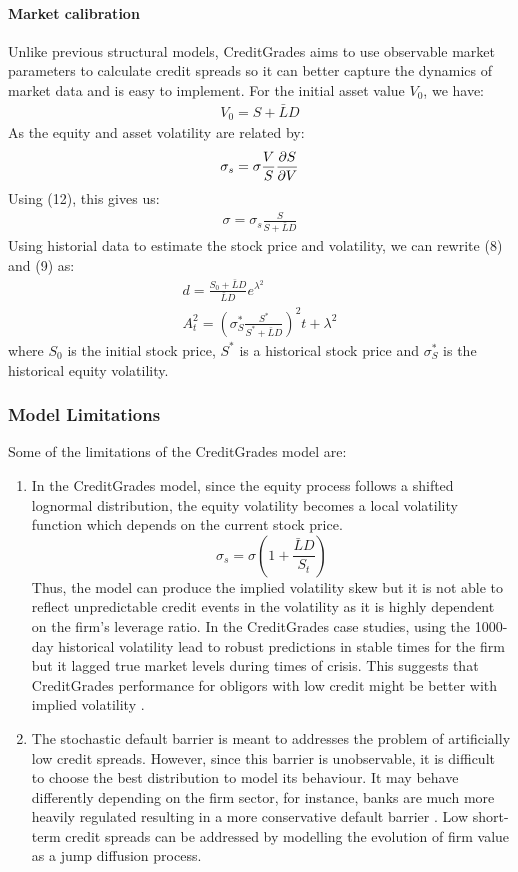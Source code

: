 \documentclass[11t,a4paper]{article}
\begin{document}
\paragraph {Market calibration}
Unlike previous structural models, CreditGrades aims to use observable market parameters to calculate credit spreads so it can better capture the dynamics of market data and is easy to implement. For the initial asset value $V_0$, we have:
\begin{align}
    V_0 = S + \bar{L}D
\end{align}
As the equity and asset volatility are related by:
\begin{align}
    \sigma_s = \sigma \frac{V}{S}\pdv{S}{V}
\end{align}
Using (12), this gives us:
\begin{align}
    \sigma = \sigma_s \frac{S}{S + \bar{L}D}
\end{align}
Using historial data to estimate the stock price and volatility, we can rewrite (8) and (9) as:
\begin{gather}
d = \frac{S_0 + \bar{L}D}{\bar{L}D} e^{\lambda^2}\\
A^2_t = (\sigma_S^*\frac{S^*}{S^*+\bar{L}D})^2t + \lambda^2
\end{gather}
where $S_0$ is the initial stock price, $S^*$ is a historical stock price and $\sigma_S^*$ is the historical equity volatility. 
\subsubsection{Model Limitations}
Some of the limitations of the CreditGrades model are:
\begin{enumerate}
    \item In the CreditGrades model, since the equity process follows a shifted lognormal distribution, the equity volatility becomes a local volatility function which depends on the current stock price. 
    \[\sigma_s = \sigma (1+\frac{\bar{L}{D}}{S_t})\]
    Thus, the model can produce the implied volatility skew but it is not able to reflect unpredictable credit events in the volatility as it is highly dependent on the firm's leverage ratio. In the CreditGrades case studies, using the 1000-day historical volatility lead to robust predictions in stable times for the firm but it lagged true market levels during times of crisis. This suggests that CreditGrades performance for obligors with low credit might be better with implied volatility \cite{cgvol}. 
    \item The stochastic default barrier is meant to addresses the problem of artificially low credit spreads. However, since this barrier is unobservable, it is difficult to choose the best distribution to model its behaviour. It may behave differently depending on the firm sector, for instance, banks are much more heavily regulated resulting in a more conservative default barrier \cite{levycg}. Low short-term credit spreads can be addressed by modelling the evolution of firm value as a jump diffusion process. 
\end{enumerate}
\end{document}
